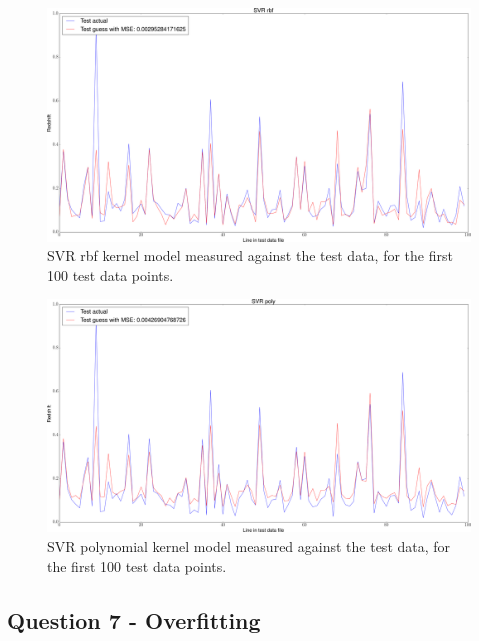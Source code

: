 \documentclass[12pt]{article}
\begin{document}
\begin{figure}[H]
	\includegraphics[scale=0.23]{linear_model_svr_rbf.png}
	\caption{SVR rbf kernel model measured against the test data, for the first 100 test data points.}
	\label{fig:svr_linear_regression}
\end{figure}

\begin{figure}[H]
	\includegraphics[scale=0.23]{linear_model_svr_poly.png}
	\caption{SVR polynomial kernel model measured against the test data, for the first 100 test data points.}
	\label{fig:svr_linear_regression}
\end{figure}


\newpage

\subsection{Question 7 - Overfitting}
\end{document}

